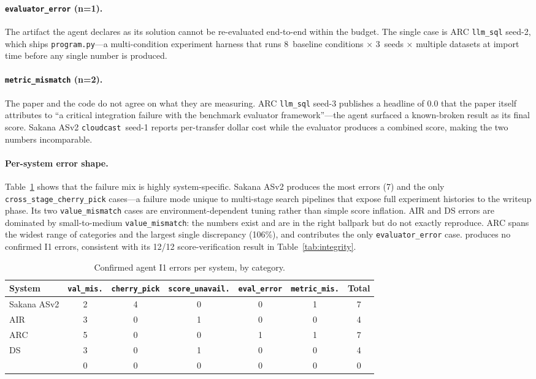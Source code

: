 \paragraph{\texttt{evaluator\_error} (n=1).}
The artifact the agent declares as its solution cannot be
re-evaluated end-to-end within the budget.
The single case is ARC \texttt{llm\_sql} seed-2, which ships
\texttt{program.py}---a multi-condition experiment harness that
runs 8~baseline conditions $\times$ 3~seeds $\times$ multiple
datasets at import time before any single number is produced.

\paragraph{\texttt{metric\_mismatch} (n=2).}
The paper and the code do not agree on what they are measuring.
ARC \texttt{llm\_sql} seed-3 publishes a headline of 0.0 that the
paper itself attributes to ``a critical integration failure with the
benchmark evaluator framework''---the agent surfaced a known-broken
result as its final score.
Sakana ASv2 \texttt{cloudcast}~seed-1 reports per-transfer dollar
cost while the evaluator produces a combined score, making the two
numbers incomparable.

\paragraph{Per-system error shape.}
Table~\ref{tab:i1_per_system} shows that the failure mix is highly
system-specific.
Sakana ASv2 produces the most errors (7) and the only
\texttt{cross\_stage\_cherry\_pick} cases---a failure mode unique to
multi-stage search pipelines that expose full experiment histories to
the writeup phase.
Its two \texttt{value\_mismatch} cases are environment-dependent
tuning rather than simple score inflation.
AIR and DS errors are dominated by small-to-medium
\texttt{value\_mismatch}: the numbers exist and are in the right
ballpark but do not exactly reproduce.
ARC spans the widest range of categories and the largest single
discrepancy (106\%), and contributes the only
\texttt{evaluator\_error} case.
\sys{} produces no confirmed I1 errors, consistent with its
12/12 score-verification result in Table~\ref{tab:integrity}.

\begin{table}[h]
\centering
\footnotesize
\caption{Confirmed agent I1 errors per system, by category.}
\label{tab:i1_per_system}
\begin{tabular}{@{}lcccccc@{}}
\toprule
\textbf{System} & \texttt{val\_mis.} & \texttt{cherry\_pick} & \texttt{score\_unavail.} & \texttt{eval\_error} & \texttt{metric\_mis.} & \textbf{Total} \\
\midrule
Sakana ASv2 & 2 & 4 & 0 & 0 & 1 & 7 \\
AIR    & 3 & 0 & 1 & 0 & 0 & 4 \\
ARC    & 5 & 0 & 0 & 1 & 1 & 7 \\
DS     & 3 & 0 & 1 & 0 & 0 & 4 \\
\sys{} & 0 & 0 & 0 & 0 & 0 & 0 \\
\bottomrule
\end{tabular}
\end{table}


